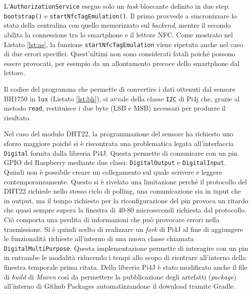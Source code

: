 %
L'\texttt{AuthorizationService} esegue solo un \textit{task} bloccante definito in due step: \texttt{bootstrap()} e \texttt{startNfcTagEmulation()}. Il primo provvede a sincronizzare lo stato della centralina con quello memorizzato sul \textit{backend}, mentre il secondo abilita la connessione tra lo smartphone e il lettore NFC. Come mostrato nel Listato \ref*{lst:as}, la funzione \texttt{startNfcTagEmulation} viene ripetuta anche nel caso di due errori specifici. Quest'ultimi non sono considerati fatali poiché possono essere provocati, per esempio da un allontamento precoce dello smartphone dal lettore.

%
Il codice del programma che permette di convertire i dati ottenuti dal sensore BH1750 in \texttt{lux} (Listato \ref*{lst:bh}), si avvale della classe \texttt{I2C} di Pi4j che, grazie al metodo \texttt{read}, restituisce i due byte (LSB e MSB) necessari per produrre il risultato.

%
Nel caso del modulo DHT22, la programmazione del sensore ha richiesto uno sforzo maggiore poiché si è riscontrata una problematica legata all'interfaccia \texttt{Digital} fornita dalla libreria Pi4J. Questa permette di comunicare con un pin GPIO del Raspberry mediante due classi: \texttt{DigitalOutput} e \texttt{DigitalInput}. Quindi non è possibile creare un collegamento sul quale scrivere e leggere contemporaneamente. Questo si è rivelato una limitazione perché il protocollo del DHT22 richiede nello stesso ciclo di polling, una comunicazione sia in input che in output, ma il tempo richiesto per la riconfigurazione del pin provoca un ritardo che quasi sempre supera la finestra di 40-80 microsecondi richiesta dal protocollo. Ciò comporta una perdita di informazioni che può provocare errori nella trasmissione. Si è quindi scelto di realizzare un \textit{fork} di Pi4J al fine di aggiungere le funzionalità richieste all'interno di una nuova classe chiamata \texttt{DigitalMultiPurpose}. Questa implementazione permette di interagire con un pin in entrambe le modalità riducendo i tempi allo scopo di rientrare all'interno della finestra temporale prima citata. Della libreria Pi4J è stato modificato anche il file di \textit{build} di \textit{Maven} così da permettere la pubblicazione degli artefatti (\textit{package}) all'interno di Github Packages automatizzandone il download tramite Gradle.\newline\newline
